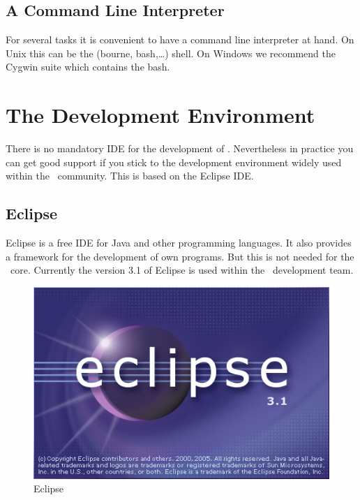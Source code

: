 \documentclass{extex-doc}
\begin{document}
\section{A Command Line Interpreter}

For several tasks it is convenient to have a command line interpreter
at hand. On Unix this can be the (bourne, bash,\ldots) shell. On Windows
we recommend the Cygwin suite which contains the bash.





\chapter{The Development Environment}

There is no mandatory IDE for the development of \ExTeX. Nevertheless
in practice you can get good support if you stick to the development
environment widely used within the \ExTeX\ community. This is based on
the Eclipse IDE.

\section{Eclipse}

Eclipse is a free IDE for Java and other programming languages. It
also provides a framework for the development of own programs. But
this is not needed for the \ExTeX\ core. Currently the version 3.1 of
Eclipse is used within the \ExTeX\ development team.
\begin{figure}[h]
  \centering  \includegraphics[scale=.5]{image/eclipse-splash}
  \caption{Eclipse}\label{fig:eclipse}
\end{figure}
\end{document}
